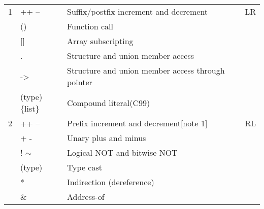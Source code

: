 \documentclass{extarticle}
\begin{document}
\begin{multicols}{4}
\begin{tabular}{|l|l|l|l|}
\hline
     &                                               &                                                             &  \\ \hline
1              & ++ --                                                 & Suffix/postfix increment and decrement                                 & LR            \\
               & ()                                                    & Function call                                                          &               \\
               & {[}{]}                                                & Array subscripting                                                     &               \\
               & .                                                     & Structure and union member access                                      &               \\
               & -\textgreater{}                                       & Structure and union member access through pointer                      &               \\
               & (type)\{list\}                                        & Compound literal(C99)                                                  &               \\ \hline
2              & ++ --                                                 & Prefix increment and decrement{[}note 1{]}                             & RL            \\
               & + -                                                   & Unary plus and minus                                                   &               \\
               & ! $\sim$                                              & Logical NOT and bitwise NOT                                            &               \\
               & (type)                                                & Type cast                                                              &               \\
               & *                                                     & Indirection (dereference)                                              &               \\
               & \&                                                    & Address-of                                                             &               \\

\end{tabular}
\end{multicols}
\end{document}
